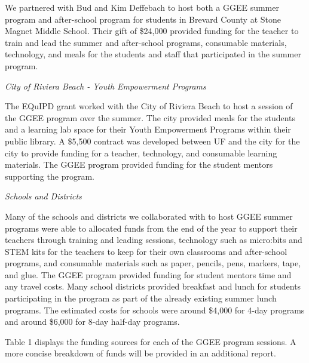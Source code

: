 \documentclass[
]{article}
\begin{document}
We partnered with Bud and Kim Deffebach to host both a GGEE summer
program and after-school program for students in Brevard County at Stone
Magnet Middle School. Their gift of \$24,000 provided funding for the
teacher to train and lead the summer and after-school programs,
consumable materials, technology, and meals for the students and staff
that participated in the summer program.

\emph{City of Riviera Beach - Youth Empowerment Programs}

The EQuIPD grant worked with the City of Riviera Beach to host a session
of the GGEE program over the summer. The city provided meals for the
students and a learning lab space for their Youth Empowerment Programs
within their public library. A \$5,500 contract was developed between UF
and the city for the city to provide funding for a teacher, technology,
and consumable learning materials. The GGEE program provided funding for
the student mentors supporting the program.

\emph{Schools and Districts}

Many of the schools and districts we collaborated with to host GGEE
summer programs were able to allocated funds from the end of the year to
support their teachers through training and leading sessions, technology
such as micro:bits and STEM kits for the teachers to keep for their own
classrooms and after-school programs, and consumable materials such as
paper, pencils, pens, markers, tape, and glue. The GGEE program provided
funding for student mentors time and any travel costs. Many school
districts provided breakfast and lunch for students participating in the
program as part of the already existing summer lunch programs. The
estimated costs for schools were around \$4,000 for 4-day programs and
around \$6,000 for 8-day half-day programs.

Table 1 displays the funding sources for each of the GGEE program
sessions. A more concise breakdown of funds will be provided in an
additional report.
\end{document}

